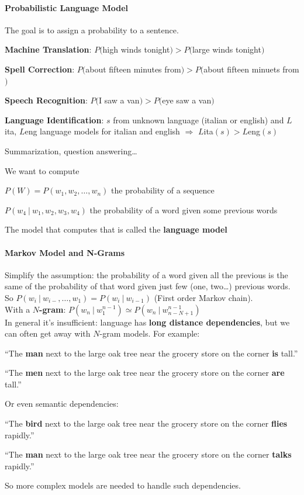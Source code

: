 \documentclass[10pt]{report}
\begin{document}
\paragraph{Probabilistic Language Model} The goal is to assign a probability to a sentence.
\begin{list}{}{}
	\item \textbf{Machine Translation}: $P($high winds tonight$) > P($large winds tonight$)$
	\item \textbf{Spell Correction}: $P($about fifteen minutes from$) > P($about fifteen minuets from$)$
	\item \textbf{Speech Recognition}: $P($I saw a van$) > P($eye saw a van$)$
	\item \textbf{Language Identification}: $s$ from unknown language (italian or english) and $L$ita, $L$eng language models for italian and english $\Rightarrow$ $L$ita$(s) > L$eng$(s)$
	\item Summarization, question answering\ldots
\end{list}
We want to compute \begin{list}{}{}
	\item $P(W) = P(w_1,w_2,\ldots,w_n)$ the probability of a sequence
	\item $P(w_4\:|\:w_1,w_2,w_3,w_4)$ the probability of a word given some previous words
\end{list}
The model that computes that is called the \textbf{language model}
\paragraph{Markov Model and N-Grams} Simplify the assumption: the probability of a word given all the previous is the same of the probability of that word given just few (one, two\ldots) previous words. So $P(w_i\:|\:w_{i-},\ldots,w_1) = P(w_i\:|\:w_{i-1})$ (First order Markov chain).\\
With a \textbf{$N$-gram}: $P(w_n\:|\:w_1^{n-1}) \simeq P(w_n\:|\:w_{n-N+1}^{n-1})$\\
In general it's insufficient: language has \textbf{long distance dependencies}, but we can often get away with $N$-gram models. For example:\begin{list}{}{}
	\item “The \textbf{man} next to the large oak tree near the grocery store on the corner \textbf{is} tall.”
	\item “The \textbf{men} next to the large oak tree near the grocery store on the corner \textbf{are} tall.”
\end{list}
Or even semantic dependencies:
\begin{list}{}{}
	\item “The \textbf{bird} next to the large oak tree near the grocery store on the corner \textbf{flies} rapidly.”
	\item “The \textbf{man} next to the large oak tree near the grocery store on the corner \textbf{talks} rapidly.”
\end{list}
So more complex models are needed to handle such dependencies.
\end{document}

